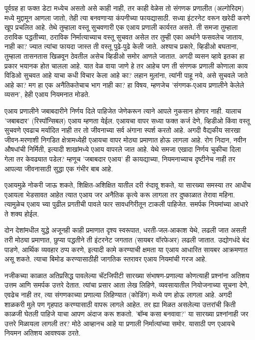 पूर्वग्रह हा फक्त डेटा मध्येच असतो असे काही नाही, तर काही वेळेस तो संगणक प्रणालीत (अल्गोरिदम) मध्ये मुद्दामून आणला जातो, तेही त्या बनवणाऱ्या कंपनीच्या फायद्यासाठी. सध्या इंटरनेट वरून खरेदी करणे खूप प्रचलित आहे. तेथे तुम्हाला वस्तू सुचवणारी एक एआय प्रणाली कार्यरत असते. ती समजा तुम्हाला ठराविक पद्धतीच्या, ठराविक निर्मात्याच्याच वस्तू सुचवत असेल तर तुम्ही एका अर्थाने फसवलेच जाताय, नाही का? ज्यात त्यांचा फायदा जास्त ती वस्तू पुढे-पुढे केली जाते. अश्याच प्रकारे, व्हिडीओ बघताना, तुम्हाला तासनतास खिळवून ठेवतील असेच व्हिडीओ समोर आणले जातात. अगदी व्यसन व्हावे इतका हा प्रकार भयानक होत चालला आहे. यात वेळ वाया जाणे हे तर आहेच पण ती संगणक प्रणाली कोणाला काय विडिओ सुचवत आहे याचा कधी विचार केला आहे का? लहान मुलांना, त्यांनी पाहू नये, असे सुचवले जाते आहे का? मग हा एक अनैतिकतेचाच भाग नाही का? हा विषय, म्हणजेच 'संगणक-एआय प्रणालीने केलेले व्यसन', हेही एआय नियमनात मोडते.

एआय प्रणालीने जबाबदारीने निर्णय दिले पाहिजेत जेणेकरून त्याने आपले नुकसान होणार नाही. यालाच 'जबाबदार' (रिस्पॉन्सिबल) एआय म्हणता येईल. एआयचा वापर सध्या फक्त कर्ज देणे, व्हिडीओ किंवा वस्तू सुचवणे एवढाच मर्यादित नाही तर तो जीवनाच्या सर्व अंगाना स्पर्श करतो आहे. अगदी वैद्यकीय सारखा जीवन-मरणाशी निगडित क्षेत्रामध्येही एआयचा वापर मोठ्या प्रमाणात होऊ लागला आहे. रोग निदान, नवीन औषधांची निर्मिती, इत्यादी शाखांमध्ये एआय वापरले जात आहे. येथे समजा एखादा निर्णय चुकीचा दिला गेला तर केवढ्यात पडेल? म्हणूच 'जबाबदार एआय' ही कायद्याच्या, नियमनाच्याच दृष्टीनेच नाही तर आपल्या जीवनासाठी सुद्धा एक गंभीर बाब आहे.

एआयमुळे नोकरी जाऊ शकते, शिक्षित-अशिक्षित यातील दरी रुंदावू शकते, या सारख्या समस्या तर आधीच एआयला भेडसावत आहेत त्यात एआय जर अनैतिक कृत्ये करू लागला तर दुष्काळात तेरावा महिना. त्यामुळेच एआय च्या पुढील प्रगतीची पावले फार सावधगिरीतून टाकली पाहिजेत. समर्पक नियमांच्या आधारे ते शक्य होईल.

दोन देशांमधील युद्धे अजूनही काही प्रमाणात दृश्य स्वरूपात, धरती-जल-आकाश येथे, लढली जात असली तरी मोठ्या प्रमाणात, छुप्या पद्धतीने ती इंटरनेट जगतात (सायबर वॉरफेअर) लढली जातात. उद्योगधंदे बंद पाडणे, आर्थिक व्यवहार ठप्प करणे, इत्यादी कामे करण्याची क्षमता या एआय आधारित सायबर आक्रमणात असू शकते. त्याचा बिमोड करण्यासाठीही जागतिक स्तरावर एआय नियमांची गरज आहे.

नजीकच्या काळात अतिप्रसिद्ध पावलेल्या चॅटजिपीटी सारख्या संभाषण-प्रणाल्या कोणत्याही प्रश्नांना अतिशय उत्तम आणि समर्पक उत्तरे देतात. त्यांचा प्रसार आता लेख लिहिणे, व्यवसायातील नियोजनाच्या सूचना देणे, एवढेच नाही तर, त्या संगणकाच्या प्रणाल्या लिहिण्यात (कोडिंग) मध्ये पण होऊ लागला आहे. अगदी शाळकरी मुले पण गृहपाठ करण्यासाठी वापरू लागले आहेत. तर ह्या मिळत असलेल्या उत्तरांची किती काळजी घेतली पाहिजे याचा आपण अंदाज करू शकतो. 'बॉम्ब कसा बनवावा?' या सारख्या प्रश्नांनाही जर उत्तरे मिळायला लागली तर? मोठे आव्हानच आहे या प्रणाली निर्मात्यांच्या समोर. यासाठी पण एआयचे नियमन अतिशय आवश्यक ठरते.

